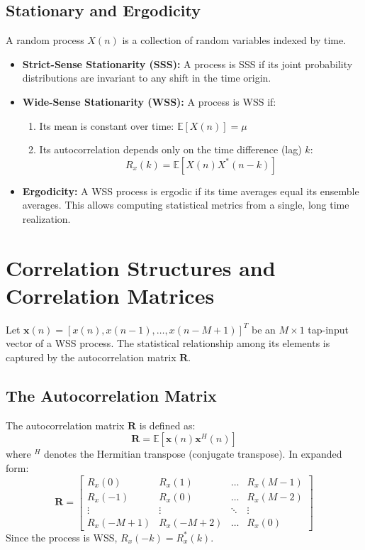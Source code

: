 \documentclass[12pt,a4paper]{article}
\begin{document}
\subsection{Stationary and Ergodicity}
A random process $X(n)$ is a collection of random variables indexed by time.
\begin{itemize}[leftmargin=*, itemsep=3pt]
  \item \textbf{Strict-Sense Stationarity (SSS):} A process is SSS if its joint probability distributions are invariant to any shift in the time origin.
  \item \textbf{Wide-Sense Stationarity (WSS):} A process is WSS if:
    \begin{enumerate}[label=\textbf{\alph*.}, leftmargin=*, itemsep=1pt]
      \item Its mean is constant over time: $\mathbb{E}[X(n)] = \mu$
      \item Its autocorrelation depends only on the time difference (lag) $k$:
      \begin{equation}
        R_x(k) = \mathbb{E}[X(n) X^*(n-k)]
      \end{equation}
    \end{enumerate}
  \item \textbf{Ergodicity:} A WSS process is ergodic if its time averages equal its ensemble averages. This allows computing statistical metrics from a single, long time realization.
\end{itemize}

\section{Correlation Structures and Correlation Matrices}

Let $\mathbf{x}(n) = [x(n), x(n-1), \dots, x(n-M+1)]^T$ be an $M \times 1$ tap-input vector of a WSS process. The statistical relationship among its elements is captured by the autocorrelation matrix $\mathbf{R}$.

\subsection{The Autocorrelation Matrix}
The autocorrelation matrix $\mathbf{R}$ is defined as:
\begin{equation}
  \mathbf{R} = \mathbb{E}[\mathbf{x}(n) \mathbf{x}^H(n)]
\end{equation}
where $^H$ denotes the Hermitian transpose (conjugate transpose). In expanded form:
\begin{equation}
  \mathbf{R} = \begin{bmatrix}
    R_x(0) & R_x(1) & \dots & R_x(M-1) \\
    R_x(-1) & R_x(0) & \dots & R_x(M-2) \\
    \vdots & \vdots & \ddots & \vdots \\
    R_x(-M+1) & R_x(-M+2) & \dots & R_x(0)
  \end{bmatrix}
\end{equation}
Since the process is WSS, $R_x(-k) = R_x^*(k)$.
\end{document}
